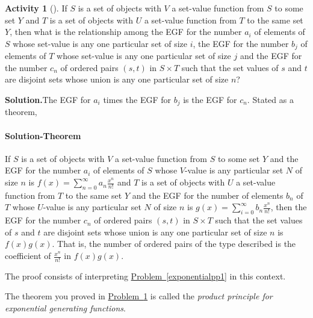 \documentclass[10pt,]{book}
\theoremstyle{plain}
\theoremstyle{definition}
\newtheorem{activity}[project]{Activity}
\numberwithin{equation}{chapter}
\begin{document}
\begin{activity}[]\label{exponentialpp3}
If \(S\) is a set of objects with \(V\) a set-value function from \(S\) to some set \(Y\) and \(T\) is a set of objects with \(U\) a set-value function from \(T\) to the same set \(Y\), then what is the relationship among the EGF for the number \(a_i\) of elements of \(S\) whose set-value is any one particular set of size \(i\), the EGF for the number \(b_j\) of elements of \(T\) whose set-value is any one particular set of size \(j\) and the EGF for the number \(c_n\) of ordered pairs \((s,t)\) in \(S\times
T\) such that the set values of \(s\) and \(t\) are disjoint sets whose union is any one particular set of size \(n\)?%
\par\medskip\noindent%
\textbf{Solution.}\quad The EGF for \(a_i\) times the EGF for \(b_j\) is the EGF for \(c_n\). Stated as a theorem,%
\typeout{************************************************}
\typeout{************************************************}
\paragraph[{Solution-Theorem}]{Solution-Theorem}\hypertarget{paragraphs-1}{}
If \(S\) is a set of objects with \(V\) a set-value function from \(S\) to some set \(Y\) and the EGF for the number \(a_i\) of elements of \(S\) whose \(V\)-value is any particular set \(N\) of size \(n\) is \(f(x)=\sum_{n=0}^\infty
a_n\frac{x^n}{n!}\) and \(T\) is a set of objects with \(U\) a set-value function from \(T\) to the same set \(Y\) and the EGF for the number of elements \(b_n\) of \(T\) whose \(U\)-value is any particular set \(N\) of size \(n\) is \(g(x) = \sum_{i=0}^\infty b_n\frac{x^n}{n!}\), then the EGF for the number \(c_n\) of ordered pairs \((s,t)\) in \(S\times T\) such that the set values of \(s\) and \(t\) are disjoint sets whose union is any one particular set of size \(n\) is \(f(x)g(x)\). That is, the number of ordered pairs of the type described is the coefficient of \(\frac{x^n}{n!}\) in \(f(x)g(x)\).%
\par
The proof consists of interpreting \hyperref[exponentialpp1]{Problem~\ref{exponentialpp1}} in this context.%
\end{activity}
The theorem you proved in \hyperref[exponentialpp3]{Problem~\ref{exponentialpp3}} is called the \emph{product principle for exponential generating functions}.%
\end{document}
